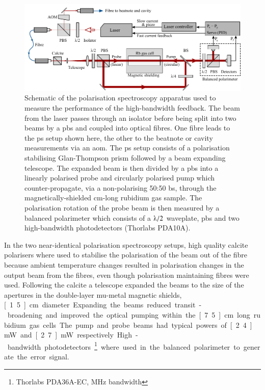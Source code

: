 \begin{figure}
\center
\includegraphics[width=\linewidth]{part1/Figs/ps_two_laser.pdf}
\caption[Apparatus used to test the efficacy of polarisation spectroscopy.]{Schematic of the polarisation spectroscopy apparatus used to measure the performance of the high-bandwidth feedback. The beam from the laser passes through an isolator before being split into two beams by a \gls{pbs} and coupled into optical fibres.
One fibre leads to the \gls{ps} setup shown here, the other to the beatnote or cavity measurements via an \gls{aom}.
The \gls{ps} setup consists of a polarisation stabilising Glan-Thompson prism followed by a beam expanding telescope.
The expanded beam is then divided by a \gls{pbs} into a linearly polarised probe and circularly polarised pump which counter-propagate, via a non-polarising 50:50 \gls{bs}, through the magnetically-shielded \unit[15]{cm}-long rubidium gas sample.
The polarisation rotation of the probe beam is then measured by a balanced polarimeter which consists of a $\lambdaup/2$ waveplate, \gls{pbs} and two high-bandwidth photodetectors (Thorlabs PDA10A).}
\label{figure:two_laser_setup}
\end{figure}

In the two near-identical polarisation spectroscopy setups, high quality calcite polarisers where used to stabilise the polarisation of the beam out of the fibre because ambient temperature changes resulted in polarisation changes in the output beam from the fibres, even though polarisation maintaining fibres were used.
Following the calcite a telescope expanded the beams to the size of the apertures in the double-layer mu-metal magnetic shields, \unit[1.5]{cm} diameter.
Expanding the beams reduced transit-broadening and improved the optical pumping within the \unit[7.5]{cm} long rubidium gas cells.
The pump and probe beams had typical powers of \unit[2.4]{mW} and \unit[2.7]{mW} respectively.
High-bandwidth photodetectors\footnote{Thorlabs PDA36A-EC, \unit[150]{MHz} bandwidth} where used in the balanced polarimeter to generate the error signal.

